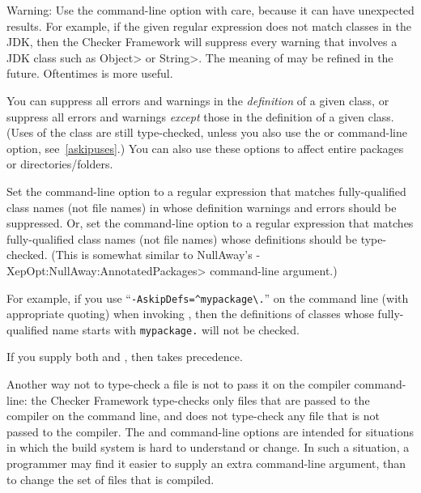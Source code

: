 Warning:  Use the  command-line option with care,
because it can have unexpected results.  For example, if the
given regular expression does not match classes in the JDK, then the
Checker Framework will suppress every warning that involves a JDK class
such as \<Object> or \<String>.  The meaning of  may be
refined in the future.  Oftentimes  is more useful.




You can suppress all errors and warnings in the \emph{definition} of a given
class, or suppress all errors and warnings \emph{except} those in the definition
of a given class.  (Uses of the class are still type-checked, unless you also use
the  or  command-line option,
see~\ref{askipuses}.)
You can also use these options to affect entire packages or directories/folders.

Set the  command-line option to a
regular expression that matches fully-qualified class names (not file names) in whose definition warnings and errors
should be suppressed.
Or, set the  command-line option to a
regular expression that matches fully-qualified class names (not file names) whose
definitions should be type-checked.
(This is somewhat similar to NullAway's
\<-XepOpt:NullAway:AnnotatedPackages> command-line argument.)

For example, if you use
``{\codesize\verb|-AskipDefs=^mypackage\.|}'' on the command line
(with appropriate quoting) when invoking
, then the definitions of
classes whose fully-qualified name starts with \codesize\verb|mypackage.|
will not be checked.

If you supply both  and , then
 takes precedence.

Another way not to type-check a file is not to pass it on the compiler
command-line:  the Checker Framework type-checks only files that are passed
to the compiler on the command line, and does not type-check any file that
is not passed to the compiler.  The  and 
command-line options
are intended for situations in which the build system is hard to understand
or change.  In such a situation, a programmer may find it easier to supply
an extra command-line argument, than to change the set of files that is
compiled.

